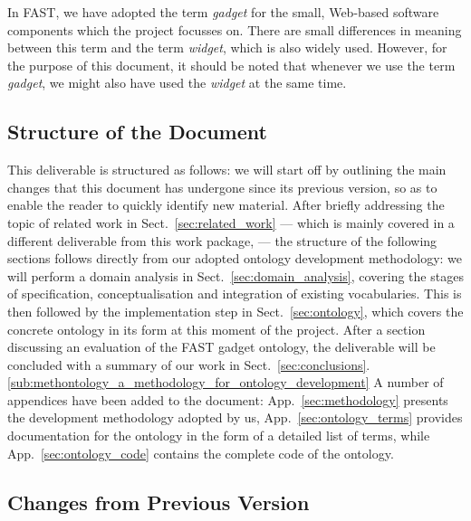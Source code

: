 \documentclass[twoside]{fast_latex}
\begin{document}
In FAST, we have adopted the term \emph{gadget} for the small, Web-based software components which the project focusses on. There are small differences in meaning between this term and the term \emph{widget}, which is also widely used. However, for the purpose of this document, it should be noted that whenever we use the term \emph{gadget}, we might also have used the \emph{widget} at the same time.


\subsection{Structure of the Document} %
\label{sub:structure_of_the_document}

This deliverable is structured as follows: 
we will start off by outlining the main changes that this document has undergone since its previous version, so as to enable the reader to quickly identify new material.
After briefly addressing the topic of related work in Sect.~\ref{sec:related_work} --- which is mainly covered in a different deliverable from this work package, \cite{urmetzer2010fast_state_of_the_art} --- the structure of the following sections follows directly from our adopted ontology development methodology: we will perform a domain analysis in Sect.~\ref{sec:domain_analysis}, covering the stages of specification, conceptualisation and integration of existing vocabularies. This is then followed by the implementation step in Sect.~\ref{sec:ontology}, which covers the concrete ontology in its form at this moment of the project. 
After a section discussing an evaluation of the FAST gadget ontology, the deliverable will be concluded with a summary of our work in Sect.~\ref{sec:conclusions}.\ref{sub:methontology_a_methodology_for_ontology_development}
A number of appendices have been added to the document: App.~\ref{sec:methodology} presents the development methodology adopted by us, App.~\ref{sec:ontology_terms} provides documentation for the ontology in the form of a detailed list of terms, while App.~\ref{sec:ontology_code} contains the complete code of the ontology.


\subsection{Changes from Previous Version} %
\label{sub:changes_from_previous_version}
\end{document}

